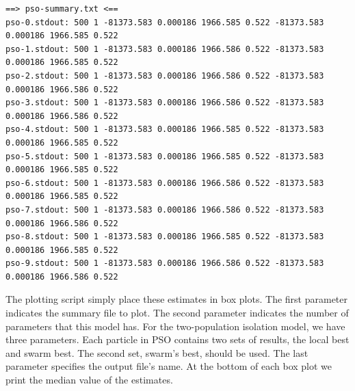 \documentclass[graybox]{svmult}
\begin{document}
{\begin{verbatim}
==> pso-summary.txt <==
pso-0.stdout: 500 1 -81373.583 0.000186 1966.585 0.522 -81373.583 0.000186 1966.585 0.522
pso-1.stdout: 500 1 -81373.583 0.000186 1966.586 0.522 -81373.583 0.000186 1966.585 0.522
pso-2.stdout: 500 1 -81373.583 0.000186 1966.586 0.522 -81373.583 0.000186 1966.586 0.522
pso-3.stdout: 500 1 -81373.583 0.000186 1966.586 0.522 -81373.583 0.000186 1966.586 0.522
pso-4.stdout: 500 1 -81373.583 0.000186 1966.585 0.522 -81373.583 0.000186 1966.585 0.522
pso-5.stdout: 500 1 -81373.583 0.000186 1966.585 0.522 -81373.583 0.000186 1966.585 0.522
pso-6.stdout: 500 1 -81373.583 0.000186 1966.586 0.522 -81373.583 0.000186 1966.585 0.522
pso-7.stdout: 500 1 -81373.583 0.000186 1966.586 0.522 -81373.583 0.000186 1966.586 0.522
pso-8.stdout: 500 1 -81373.583 0.000186 1966.585 0.522 -81373.583 0.000186 1966.585 0.522
pso-9.stdout: 500 1 -81373.583 0.000186 1966.586 0.522 -81373.583 0.000186 1966.586 0.522
\end{verbatim}}

The plotting script simply place these estimates in box plots.  The first parameter indicates the summary file to plot.  The second parameter indicates the number of parameters that this model has.  For the two-population isolation model, we have three parameters.  Each particle in PSO contains two sets of results, the local best and swarm best.  The second set, swarm's best, should be used.  The last parameter specifies the output file's name.  At the bottom of each box plot we print the median value of the estimates.
\end{document}
